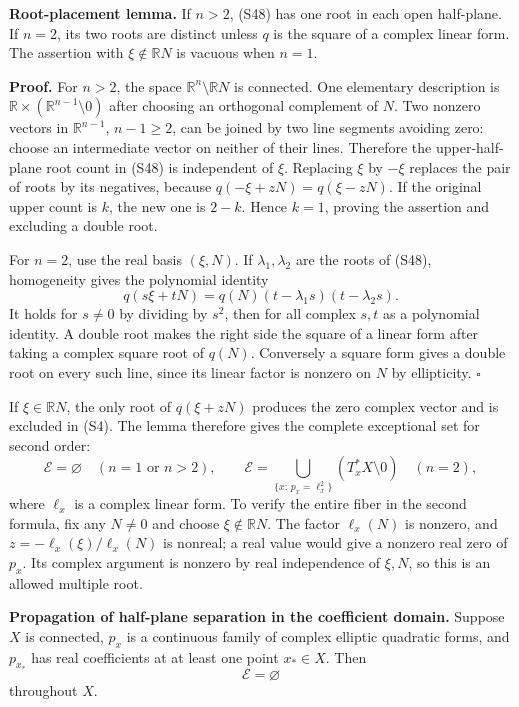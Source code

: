 \documentclass[
  11pt,
]{article}
\begin{document}
\textbf{Root-placement lemma.} If \(n>2\), (S48) has one root in each
open half-plane. If \(n=2\), its two roots are distinct unless \(q\) is
the square of a complex linear form. The assertion with
\(\xi\notin\mathbb RN\) is vacuous when \(n=1\).

\textbf{Proof.} For \(n>2\), the space
\(\mathbb R^n\setminus\mathbb RN\) is connected. One elementary
description is \(\mathbb R\times(\mathbb R^{n-1}\setminus0)\) after
choosing an orthogonal complement of \(N\). Two nonzero vectors in
\(\mathbb R^{n-1}\), \(n-1\geq2\), can be joined by two line segments
avoiding zero: choose an intermediate vector on neither of their lines.
Therefore the upper-half-plane root count in (S48) is independent of
\(\xi\). Replacing \(\xi\) by \(-\xi\) replaces the pair of roots by its
negatives, because \(q(-\xi+zN)=q(\xi-zN)\). If the original upper count
is \(k\), the new one is \(2-k\). Hence \(k=1\), proving the assertion
and excluding a double root.

For \(n=2\), use the real basis \((\xi,N)\). If \(\lambda_1,\lambda_2\)
are the roots of (S48), homogeneity gives the polynomial identity \[
 q(s\xi+tN)=q(N)(t-\lambda_1s)(t-\lambda_2s).                     \tag{S50}
\] It holds for \(s\ne0\) by dividing by \(s^2\), then for all complex
\(s,t\) as a polynomial identity. A double root makes the right side the
square of a linear form after taking a complex square root of \(q(N)\).
Conversely a square form gives a double root on every such line, since
its linear factor is nonzero on \(N\) by ellipticity. \(\square\)

If \(\xi\in\mathbb RN\), the only root of \(q(\xi+zN)\) produces the
zero complex vector and is excluded in (S4). The lemma therefore gives
the complete exceptional set for second order: \[
 \mathcal E=\varnothing\quad(n=1\text{ or }n>2),\qquad
 \mathcal E=\bigcup_{\{x:\,p_x=\ell_x^2\}}
                      (T_x^*X\setminus0)\quad(n=2),              \tag{S51}
\] where \(\ell_x\) is a complex linear form. To verify the entire fiber
in the second formula, fix any \(N\ne0\) and choose
\(\xi\notin\mathbb RN\). The factor \(\ell_x(N)\) is nonzero, and
\(z=-\ell_x(\xi)/\ell_x(N)\) is nonreal; a real value would give a
nonzero real zero of \(p_x\). Its complex argument is nonzero by real
independence of \(\xi,N\), so this is an allowed multiple root.

\textbf{Propagation of half-plane separation in the coefficient domain.}
Suppose \(X\) is connected, \(p_x\) is a continuous family of complex
elliptic quadratic forms, and \(p_{x_*}\) has real coefficients at at
least one point \(x_*\in X\). Then \[
                              \mathcal E=\varnothing             \tag{S52}
\] throughout \(X\).
\end{document}
